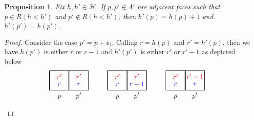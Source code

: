 \documentclass[reqno,11pt]{amsart}
\numberwithin{equation}{section}
\newtheorem{proposition}{Proposition}[section]
\theoremstyle{definition}
\begin{document}
\begin{proposition} \label{lem:adjacent faces}
    Fix $h,h' \in \mathscr{H}$. If $p,p' \in \Lambda'$ are adjacent faces such that $p \in R(h<h')$ and $p' \notin R(h<h')$, then $h'(p) = h(p)+1$ and $h'(p') = h(p')$.
\end{proposition}
\begin{proof}
    Consider the case $p'=p+\mathbb{e}_1$. Calling $r=h(p)$ and $r'=h'(p)$, then we have $h(p')$ is either $r$ or $r-1$ and $h'(p')$ is either $r'$ or $r'-1$ as depicted below
    \begin{equation*}
        \begin{tikzpicture}
            \draw[thick] (0,0) -- (1,0) -- (1,1) -- (0,1) -- (0,0);
            \node[] at (.5,.3) {\small \textcolor{blue}{$r$}};
            \node[] at (.5,.7) {\small \textcolor{red}{$r'$}};
            \draw[thick] (1,0) -- (2,0) -- (2,1) -- (1,1) -- (1,0);
            \node[] at (1.5,.3) {\small \textcolor{blue}{$r$}};
            \node[] at (1.5,.7) {\small \textcolor{red}{$r'$}};
            \node[below] at (.5,-.12) {$p$};
            \node[below] at (1.5,0) {$p'$};

            \draw[thick,xshift=3cm] (0,0) -- (1,0) -- (1,1) -- (0,1) -- (0,0);
            \node[xshift=3cm] at (.5,.3) {\small \textcolor{blue}{$r$}};
            \node[xshift=3cm] at (.5,.7) {\small \textcolor{red}{$r'$}};
            \draw[thick,xshift=3cm] (1,0) -- (2,0) -- (2,1) -- (1,1) -- (1,0);
            \node[xshift=3cm] at (1.5,.3) {\small \textcolor{blue}{$r-1$}};
            \node[xshift=3cm] at (1.5,.7) {\small \textcolor{red}{$r'$}};
            \node[below,xshift=3cm] at (.5,-.12) {$p$};
            \node[below,xshift=3cm] at (1.5,0) {$p'$};

            \draw[thick,xshift=6cm] (0,0) -- (1,0) -- (1,1) -- (0,1) -- (0,0);
            \node[xshift=6cm] at (.5,.3) {\small \textcolor{blue}{$r$}};
            \node[xshift=6cm] at (.5,.7) {\small \textcolor{red}{$r'$}};
            \draw[thick,xshift=6cm] (1,0) -- (2,0) -- (2,1) -- (1,1) -- (1,0);
            \node[xshift=6cm] at (1.5,.3) {\small \textcolor{blue}{$r$}};
            \node[xshift=6cm] at (1.5,.7) {\small \textcolor{red}{$r'-1$}};
            \node[below,xshift=6cm] at (.5,-.12) {$p$};
            \node[below,xshift=6cm] at (1.5,0) {$p'$};


\end{tikzpicture}
\end{equation*}
\end{proof}
\end{document}
